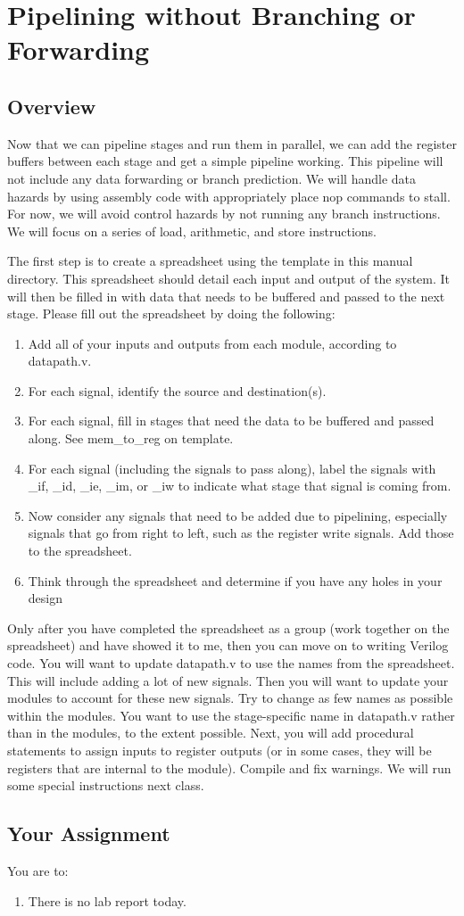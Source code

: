 \chapter{Pipelining without Branching or Forwarding}


\section{Overview}
Now that we can pipeline stages and run them in parallel, we can add the register buffers between each stage and get a simple pipeline working.  This pipeline will not include any data forwarding or branch prediction.  We will handle data hazards by using assembly code with appropriately place nop commands to stall.  For now, we will avoid control hazards by not running any branch instructions.  We will focus on a series of load, arithmetic, and store instructions.

The first step is to create a spreadsheet using the template in this manual directory.  This spreadsheet should detail each input and output of the system.  It will then be filled in with data that needs to be buffered and passed to the next stage.  Please fill out the spreadsheet by doing the following:
\begin{enumerate}
	\item Add all of your inputs and outputs from each module, according to datapath.v.
	\item For each signal, identify the source and destination(s).
	\item For each signal, fill in stages that need the data to be buffered and passed along.  See mem\_to\_reg on template.
	\item For each signal (including the signals to pass along), label the signals with \_if, \_id, \_ie, \_im, or \_iw to indicate what stage that signal is coming from.
	\item Now consider any signals that need to be added due to pipelining, especially signals that go from right to left, such as the register write signals.  Add those to the spreadsheet.
	\item Think through the spreadsheet and determine if you have any holes in your design
\end{enumerate}  

Only after you have completed the spreadsheet as a group (work together on the spreadsheet) and have showed it to me, then you can move on to writing Verilog code.  You will want to update datapath.v to use the names from the spreadsheet.  This will include adding a lot of new signals.  Then you will want to update your modules to account for these new signals.  Try to change as few names as possible within the modules.  You want to use the stage-specific name in datapath.v rather than in the modules, to the extent possible.  Next, you will add procedural statements to assign inputs to register outputs (or in some cases, they will be registers that are internal to the module).  Compile and fix warnings.  We will run some special instructions next class.  


\section{Your Assignment}

You are to:
\begin{enumerate}
\item There is no lab report today.
\end{enumerate} 
